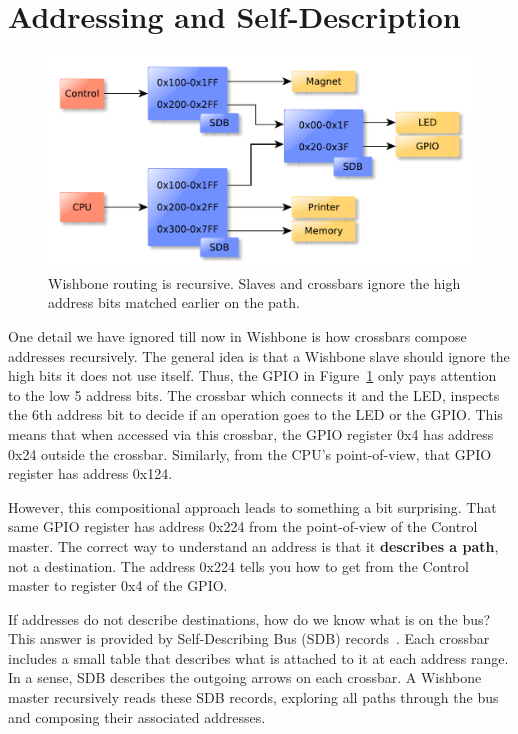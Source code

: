 \documentclass[a4paper]{jacow}
\begin{document}
\section{Addressing and Self-Description}

\begin{figure}[t]
  \centering
  \includegraphics*[width=\columnwidth]{addressing}
  \caption{Wishbone routing is recursive. Slaves and crossbars
  ignore the high address bits matched earlier on the path.}
  \label{fig:addressing}
\end{figure}

One detail we have ignored till now in Wishbone is how crossbars compose
addresses recursively.
The general idea is that a Wishbone slave should ignore the high bits it
does not use itself.
Thus, the GPIO in Figure~\ref{fig:addressing} only pays attention to the low 
5 address bits.
The crossbar which connects it and the LED,
inspects the 6th address bit to decide if an operation goes to the LED or
the GPIO.
This means that when accessed via this crossbar, 
the GPIO register 0x4 has address 0x24 outside the crossbar.
Similarly, from the CPU's point-of-view, that GPIO register has address 0x124.

However, this compositional approach leads to something a bit surprising.
That same GPIO register has address 0x224 from the point-of-view of 
the Control master.
The correct way to understand an address is that it \textbf{describes a path}, 
not a destination.
The address 0x224 tells you how to get from the Control master to register
0x4 of the GPIO.

If addresses do not describe destinations, how do we know what is on the bus?
This answer is provided by Self-Describing Bus (SDB) records~\cite{sdb}.
Each crossbar includes a small table that describes what is attached to it
at each address range.
In a sense, SDB describes the outgoing arrows on each crossbar.
A Wishbone master recursively reads these SDB records, 
exploring all paths through the bus and composing their associated addresses.
\end{document}
